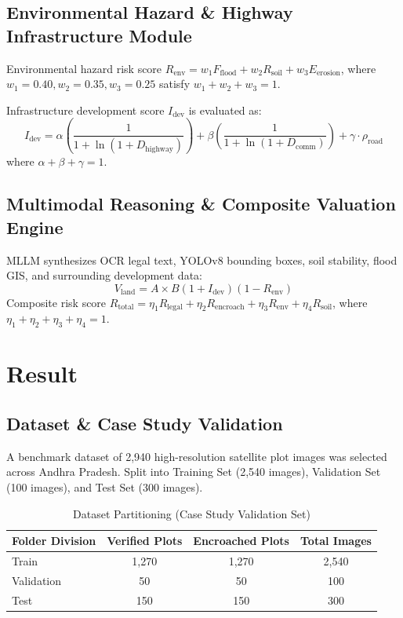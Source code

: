 \documentclass[conference]{IEEEtran}
\begin{document}
\subsection{Environmental Hazard \& Highway Infrastructure Module}
Environmental hazard risk score $R_{\text{env}} = w_1 F_{\text{flood}} + w_2 R_{\text{soil}} + w_3 E_{\text{erosion}}$, where $w_1 = 0.40, w_2 = 0.35, w_3 = 0.25$ satisfy $w_1 + w_2 + w_3 = 1$.

Infrastructure development score $I_{\text{dev}}$ is evaluated as:
\begin{equation}
I_{\text{dev}} = \alpha \left( \frac{1}{1 + \ln(1 + D_{\text{highway}})} \right) + \beta \left( \frac{1}{1 + \ln(1 + D_{\text{comm}})} \right) + \gamma \cdot \rho_{\text{road}}
\end{equation}
where $\alpha + \beta + \gamma = 1$.

\subsection{Multimodal Reasoning \& Composite Valuation Engine}
MLLM synthesizes OCR legal text, YOLOv8 bounding boxes, soil stability, flood GIS, and surrounding development data:
\begin{equation}
V_{\text{land}} = A \times B (1 + I_{\text{dev}})(1 - R_{\text{env}})
\end{equation}
Composite risk score $R_{\text{total}} = \eta_1 R_{\text{legal}} + \eta_2 R_{\text{encroach}} + \eta_3 R_{\text{env}} + \eta_4 R_{\text{soil}}$, where $\eta_1 + \eta_2 + \eta_3 + \eta_4 = 1$.

\section{Result}

\subsection{Dataset \& Case Study Validation}
A benchmark dataset of 2,940 high-resolution satellite plot images was selected across Andhra Pradesh. Split into Training Set (2,540 images), Validation Set (100 images), and Test Set (300 images).

\begin{table}[htbp]
\caption{Dataset Partitioning (Case Study Validation Set)}
\begin{center}
\begin{tabular}{|l|c|c|c|}
\hline
\textbf{Folder Division} & \textbf{Verified Plots} & \textbf{Encroached Plots} & \textbf{Total Images} \\
\hline
Train & 1,270 & 1,270 & 2,540 \\
Validation & 50 & 50 & 100 \\
Test & 150 & 150 & 300 \\
\hline
\end{tabular}
\label{tab:dataset}
\end{center}
\end{table}
\end{document}
